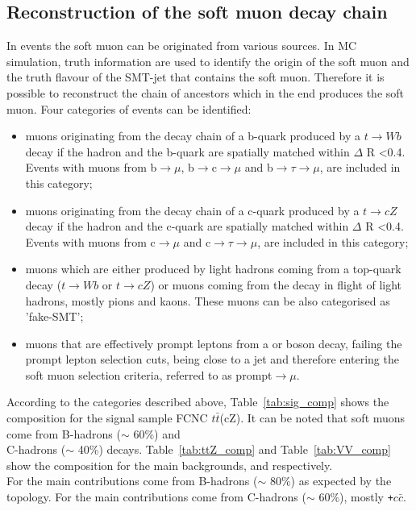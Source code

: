 \subsection {Reconstruction of the soft muon decay chain}
\label{sec:smt_compositions}
In \ttbar events the soft muon can be originated from various sources. In MC simulation, truth information are used to identify the origin of the soft muon and the truth flavour of the SMT-jet that contains the soft muon. Therefore it is possible to reconstruct the chain of ancestors which in the end produces the soft muon. 
Four categories of events can be identified:
\begin{itemize}
	\item muons originating from the decay chain of a b-quark produced by a $t\rightarrow Wb$ decay if the hadron and the b-quark are spatially matched within $\Delta$ R <0.4. Events with muons from b$\rightarrow \mu$, b$\rightarrow$c$\rightarrow \mu$ and b$\rightarrow \tau \rightarrow \mu$, are included in this category;
	\item muons originating from the decay chain of a c-quark produced by a $t\rightarrow cZ$ decay if the hadron and the c-quark are spatially matched within $\Delta$ R <0.4. Events with muons from c$\rightarrow \mu$ and c$\rightarrow \tau \rightarrow \mu$,   are included in this category;
	\item muons which are either produced by light hadrons coming from a top-quark decay ($t\rightarrow Wb$ or $t\rightarrow cZ$) or muons coming from the decay in flight of light hadrons, mostly pions and kaons. These muons can be also categorised as 'fake-SMT';
	\item muons that are effectively prompt leptons from a \PW or \PZ boson decay, failing the prompt lepton selection cuts, being close to a jet and therefore entering the soft muon selection criteria, referred to as prompt$\rightarrow \mu$.
\end{itemize}
According to the categories described above, Table~\ref{tab:sig_comp} shows the composition for the signal sample FCNC $t\bar{t}$(cZ). It can be noted that soft muons come from B-hadrons ($\sim$ 60\%)  and\\ C-hadrons ($\sim$ 40\%) decays.
Table~\ref{tab:ttZ_comp} and Table~\ref{tab:VV_comp} show the composition for the main backgrounds, \ttZ and \VVHF respectively. \\
For \ttZ the main contributions come from B-hadrons ($\sim$ 80\%) as expected by the \ttZ topology.
For \VVHF the main contributions come from C-hadrons ($\sim$ 60\%), mostly  \WZ\texttt{+$c\bar{c}$}.

